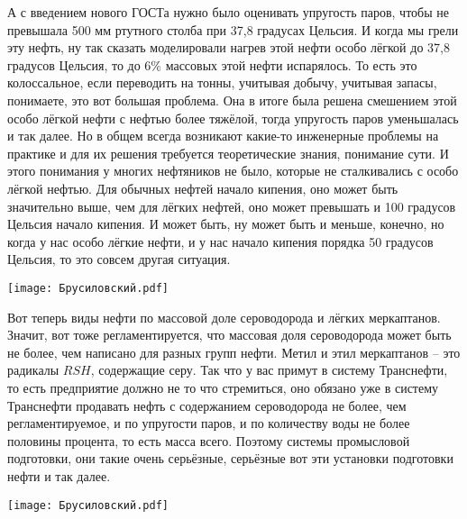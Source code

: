 \documentclass[main.tex]{subfiles}
\begin{document}
А с введением нового ГОСТа нужно было оценивать упругость паров, чтобы не превышала 500 мм ртутного столба при 37,8 градусах Цельсия.
И когда мы грели эту нефть, ну так сказать моделировали нагрев этой нефти особо лёгкой до 37,8 градусов Цельсия, то до 6\% массовых этой нефти испарялось.
То есть это колоссальное, если переводить на тонны, учитывая добычу, учитывая запасы, понимаете, это вот большая проблема.
Она в итоге была решена смешением этой особо лёгкой нефти с нефтью более тяжёлой, тогда упругость паров уменьшалась и так далее.
Но в общем всегда возникают какие-то инженерные проблемы на практике и для их решения требуется теоретические знания, понимание сути.
И этого понимания у многих нефтяников не было, которые не сталкивались с особо лёгкой нефтью.
Для обычных нефтей начало кипения, оно может быть значительно выше, чем для лёгких нефтей, оно может превышать и 100 градусов Цельсия начало кипения.
И может быть, ну может быть и меньше, конечно, но когда у нас особо лёгкие нефти, и у нас начало кипения порядка 50 градусов Цельсия, то это совсем другая ситуация.

\begin{center}
\texttt{[image: Брусиловский.pdf]}
\end{center}

Вот теперь виды нефти по массовой доле сероводорода и лёгких меркаптанов.
Значит, вот тоже регламентируется, что массовая доля сероводорода может быть не более, чем написано для разных групп нефти.
Метил и этил меркаптанов -- это радикалы $RSH$, содержащие серу.
Так что у вас примут в систему Транснефти, то есть предприятие должно не то что стремиться, оно обязано уже в систему Транснефти продавать нефть с содержанием сероводорода не более, чем регламентируемое, и по упругости паров, и по количеству воды не более половины процента, то есть масса всего.
Поэтому системы промысловой подготовки, они такие очень серьёзные, серьёзные вот эти установки подготовки нефти и так далее.

\begin{center}
\texttt{[image: Брусиловский.pdf]}
\end{center}
\end{document}
